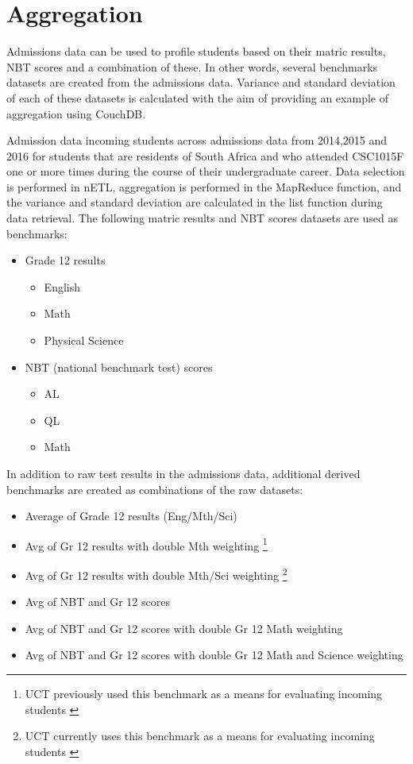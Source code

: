 \section{Aggregation}
Admissions data can be used to profile students based on their matric results, NBT scores and a combination of these. In other words, several benchmarks datasets are created from the admissions data. Variance and standard deviation of each of these datasets is calculated with the aim of providing an example of aggregation using CouchDB.

Admission data incoming students across admissions data from 2014,2015 and 2016 for students that are residents of South Africa and who attended CSC1015F one or more times during the course of their undergraduate career. Data selection is performed in nETL, aggregation is performed in the MapReduce function, and the variance and standard deviation are calculated in the list function during data retrieval. The following matric results and NBT scores datasets are used as benchmarks:

\begin{itemize}
  \item Grade 12 results
        \begin{itemize}
          \item English
          \item Math
          \item Physical Science
        \end{itemize}
  \item NBT (national benchmark test) scores
        \begin{itemize}
          \item AL
          \item QL
          \item Math
        \end{itemize}
\end{itemize}

In addition to raw test results in the admissions data, additional derived benchmarks are created as combinations of the raw datasets:

\begin{itemize}
  \item Average of Grade 12 results (Eng/Mth/Sci)
  \item Avg of Gr 12 results with double Mth weighting \footnote{UCT previously used this benchmark as a means for evaluating incoming students \cite{sonia2018}}
  \item Avg of Gr 12 results with double Mth/Sci weighting \footnote{UCT currently uses this benchmark as a means for evaluating incoming students \cite{sonia2018}}
  \item Avg of NBT and Gr 12 scores
  \item Avg of NBT and Gr 12 scores with double Gr 12 Math weighting
  \item Avg of NBT and Gr 12 scores with double Gr 12 Math and Science weighting
\end{itemize}

